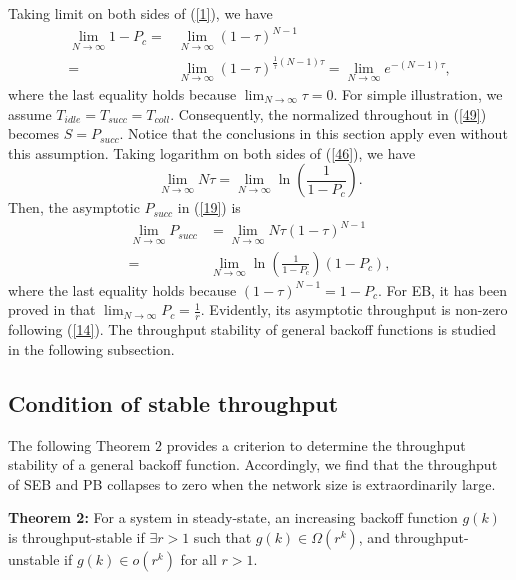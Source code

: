 \documentclass[journal]{IEEEtran}
\begin{document}
Taking limit on both sides of (\ref{1}), we have
\begin{equation}
\label{46}
\begin{aligned}
\lim_{N\rightarrow \infty}1-P_c =&  \lim_{N\rightarrow \infty}\left(1-\tau\right)^{N-1}\\
=& \lim_{N\rightarrow \infty}\left(1-\tau\right)^{\frac{1}{\tau}(N-1)\tau} =\lim_{N\rightarrow \infty} e^{-(N-1)\tau},
\end{aligned}
\end{equation}
where the last equality holds because $\lim_{N\rightarrow\infty}\tau=0$. For simple illustration, we assume $T_{idle}=T_{succ}=T_{coll}$. Consequently, the normalized throughout in (\ref{49}) becomes $S=P_{succ}$. Notice that the conclusions in this section apply even without this assumption. Taking logarithm on both sides of (\ref{46}), we have
\begin{equation}
\lim_{N\rightarrow \infty}N\tau =\lim_{N\rightarrow \infty}\ln\left(\frac{1}{1-P_c}\right).
\end{equation}
Then, the asymptotic $P_{succ}$ in (\ref{19}) is
\begin{equation}
\label{14}
\begin{aligned}
\lim_{N\rightarrow\infty} P_{succ}& =  \lim_{N\rightarrow\infty} N\tau(1-\tau)^{N-1} \\
=& \lim_{N\rightarrow\infty}\ln \left(\frac{1}{1-P_c}\right)(1-P_c),
\end{aligned}
\end{equation}
where the last equality holds because $\left(1-\tau\right)^{N-1}=1-P_c$. For EB, it has been proved in \cite{2007:Kumar} that $\lim_{N \rightarrow \infty}P_c =\frac{1}{r}$. Evidently, its asymptotic throughput is non-zero following (\ref{14}). The throughput stability of general backoff functions is studied in the following subsection.

\subsection{Condition of stable throughput}
The following Theorem $2$ provides a criterion to determine the throughput stability of a general backoff function. Accordingly, we find that the throughput of SEB and PB collapses to zero when the network size is extraordinarily large.

\textbf{Theorem 2:} For a system in steady-state, an increasing backoff function $g(k)$ is throughput-stable if $\exists r>1$ such that $g(k)\in\Omega\left(r^k\right)$, and throughput-unstable if  $g(k)\in o\left(r^k\right)$ for all $r>1$.
\end{document}
